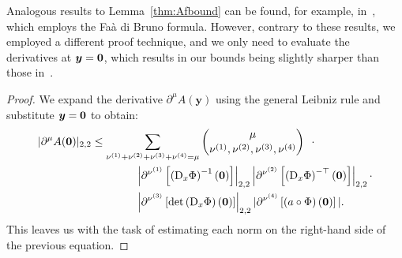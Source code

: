 Analogous results to Lemma~\ref{thm:Afbound} can be found, for example, in~\cite{harbrecht2016}, which employs the Faà di Bruno formula.
However, contrary to these results, we employed a different proof technique, and we only need to evaluate the derivatives at ${\bm{y}}=\bm{0}$, which results in our bounds being slightly sharper than those in~\cite{harbrecht2016}.
\begin{proof}
    We expand the derivative  $\partial^{\mu}{A}(\bm{y})$ using the general Leibniz rule and substitute ${\bm{y}} = \bm{0}$ to obtain:
    \begin{align}
        |\partial^\mu {A}(\bm{0}) |_{2,2}  &\leq \sum_{{\nu^{(1)}}+{\nu^{(2)}}+{\nu^{(3)}}+{\nu^{(4)}}=\mu} \binom{\mu}{\nu^{(1)},\nu^{(2)},\nu^{(3)}, {\nu^{(4)}}}\,\,\,\, \cdot \nonumber\\
        &\qquad \qquad\left| \partial^{\nu^{(1)}}\left[ \left( \mathop{}\!\mathrm{D}_x \Phi \right)^{-1} (\bm{0})\right]\right|_{2,2} \left|   \partial^{\nu^{(2)}}\left[ \left( \mathop{}\!\mathrm{D}_x \Phi \right)^{-\top} (\bm{0})\right]   \right|_{2,2}\cdot\nonumber\\
        &\qquad \qquad\left|\partial^{\nu^{(3)}}\left[\det\left( \mathop{}\!\mathrm{D}_x \Phi \right) (\bm{0})\right]\right|_{2,2} | \partial^{{\nu^{(4)}}}\left[\left( a \circ \Phi \right)(\bm{0}) \right]|.\label{eq:inbetweenbound}
    \end{align}
    This leaves us with the task of estimating each norm on the right-hand side of the previous equation.


\end{proof}
